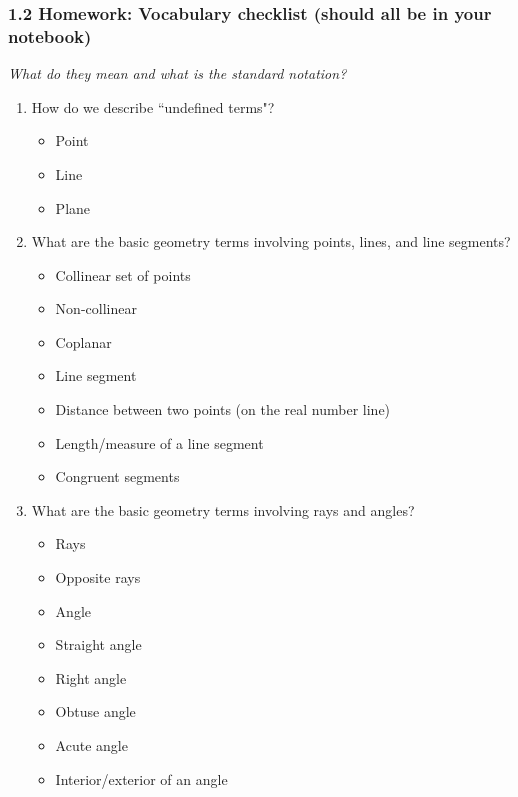 

\fancyhead[LE]{\thepage}



\subsubsection*{1.2 Homework: Vocabulary checklist (should all be in your notebook)}
\emph{What do they mean and what is the standard notation?}
\begin{enumerate}
\item How do we describe ``undefined terms"?
\begin{itemize}
    \item Point
    \item Line
    \item Plane
\end{itemize}

\item What are the basic geometry terms involving points, lines, and line segments?
\begin{itemize}
    \item Collinear set of points
    \item Non-collinear
    \item Coplanar
    \item Line segment
    \item Distance between two points (on the real number line)
    \item Length/measure of a line segment
    \item Congruent segments
\end{itemize}

\item What are the basic geometry terms involving rays and angles?
\begin{itemize}
    \item Rays
    \item Opposite rays
    \item Angle
    \item Straight angle
    \item Right angle
    \item Obtuse angle
    \item Acute angle
    \item Interior/exterior of an angle
\end{itemize}

  
\end{enumerate}
